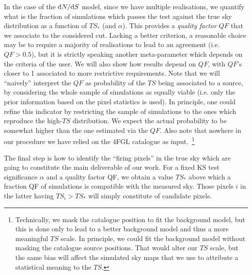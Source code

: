 In the case of the $\textrm{d}N/\textrm{d}S$ model, since we have multiple realisations, we quantify what is the fraction of simulations which passes the test against the true sky distribution as a function of $TS_*$ (and $\alpha$). This provides a \textit{quality factor} $QF$ that we associate to the considered cut. Lacking a better criterion, a reasonable choice may be to require a majority of realisations to lead to an agreement (i.e. $QF>0.5$), but it is strictly speaking another meta-parameter which depends on the criteria of the user.  We will also show how results depend on $QF$, with $QF$'s closer to 1 associated to more restrictive requirements. Note that we will ``naively'' interpret the $QF$ as probability of the $TS$ being associated to a source, by considering the whole sample of simulations as equally viable (i.e. only the prior information based on the pixel statistics is used). In principle, one could refine this indicator by restricting the sample of simulations to the ones which reproduce the high-$TS$ distribution. We expect the actual probability to be somewhat higher than the one estimated via the $QF$. Also note that nowhere in our procedure we have relied on the 4FGL catalogue as input.~\footnote{Technically, we mask the catalogue position to fit the background model, but this is done only to lead to a better  background model and thus a more meaningful $TS$ scale. In principle, we could fit the background model without masking the catalogue source positions. That would alter our $TS$ scale, but the same bias will affect the simulated sky maps that we use to attribute a statistical meaning to the $TS$.}

The final step is how to identify the ``firing pixels'' in the true sky which are going to constitute the main deliverable of our work. For a fixed KS test significance $\alpha$ and a quality factor QF, we obtain a value $TS_*$ above which a fraction QF of simulations is compatible with the measured sky. Those pixels $i$ in the latter having $TS_i>TS_*$ will simply constitute of candidate pixels.

